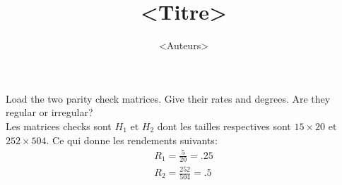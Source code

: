 \documentclass[12pt,a4paper]{article}
\title{<Titre>}
\author{<Auteurs>}
\begin{document}
	\maketitle
\begin{question}
	Load the two parity check matrices. Give their rates and degrees. Are they regular or irregular?\\
	Les matrices checks sont $H_1$ et $H_2$ dont les tailles respectives sont $15\times 20$ et $252\times 504$. Ce qui donne les rendements suivants:
	\begin{align*}
		R_1=\frac{5}{20}=\num{.25}\\
		R_2=\frac{252}{504}=\num{.5}
	\end{align*}
	
\end{question}
\end{document}
